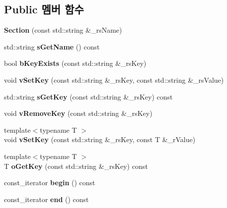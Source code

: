 \subsection*{Public 멤버 함수}
\begin{DoxyCompactItemize}
\item 
\mbox{\label{class_v_b_a_1_1_config_1_1_section_af1a15ac7cc46f2738a702b7dcbf62de2}} 
{\bfseries Section} (const std\+::string \&\+\_\+rs\+Name)
\item 
\mbox{\label{class_v_b_a_1_1_config_1_1_section_a5d966e5bee05a441c62f775b79224baf}} 
std\+::string {\bfseries s\+Get\+Name} () const
\item 
\mbox{\label{class_v_b_a_1_1_config_1_1_section_a2c189e6a7e47e3c13a4e3eb6aa7f477e}} 
bool {\bfseries b\+Key\+Exists} (const std\+::string \&\+\_\+rs\+Key)
\item 
\mbox{\label{class_v_b_a_1_1_config_1_1_section_a57e1b95cbea40db71c093381beff4b0e}} 
void {\bfseries v\+Set\+Key} (const std\+::string \&\+\_\+rs\+Key, const std\+::string \&\+\_\+rs\+Value)
\item 
\mbox{\label{class_v_b_a_1_1_config_1_1_section_a7ac9dfabf38bc1db83a6017e130f04ac}} 
std\+::string {\bfseries s\+Get\+Key} (const std\+::string \&\+\_\+rs\+Key) const
\item 
\mbox{\label{class_v_b_a_1_1_config_1_1_section_a4634d3e637b664d40ba4d36f859e4573}} 
void {\bfseries v\+Remove\+Key} (const std\+::string \&\+\_\+rs\+Key)
\item 
\mbox{\label{class_v_b_a_1_1_config_1_1_section_afd12017e2b18dd1e1be08dde721a37d0}} 
{\footnotesize template$<$typename T $>$ }\\void {\bfseries v\+Set\+Key} (const std\+::string \&\+\_\+rs\+Key, const T \&\+\_\+r\+Value)
\item 
\mbox{\label{class_v_b_a_1_1_config_1_1_section_ab169d7aae4e9dde91418ba1668e3ad39}} 
{\footnotesize template$<$typename T $>$ }\\T {\bfseries o\+Get\+Key} (const std\+::string \&\+\_\+rs\+Key) const
\item 
\mbox{\label{class_v_b_a_1_1_config_1_1_section_ac345183b43a45fd3eeaa646eac631390}} 
const\+\_\+iterator {\bfseries begin} () const
\item 
\mbox{\label{class_v_b_a_1_1_config_1_1_section_a15ff15ecb9f7f3aa0bb1c218d47f8829}} 
const\+\_\+iterator {\bfseries end} () const
\end{DoxyCompactItemize}


